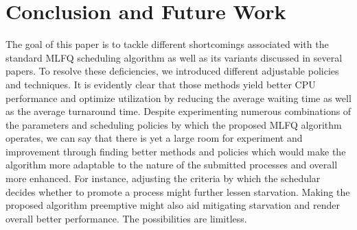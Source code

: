 \documentclass[conference]{IEEEtran}
\begin{document}

\section{Conclusion and Future Work}

The goal of this paper is to tackle different shortcomings associated with the standard MLFQ scheduling algorithm as well as its variants discussed in several papers. To resolve these deficiencies, we introduced different adjustable policies and techniques. It is evidently clear that those methods yield better CPU performance and optimize utilization by reducing the average waiting time as well as the average turnaround time. Despite experimenting numerous combinations of the parameters and scheduling policies by which the proposed MLFQ algorithm operates, we can say that there is yet a large room for experiment and improvement through finding better methods and policies which would make the algorithm more adaptable to the nature of the submitted processes and overall more enhanced. For instance, adjusting the criteria by which the schedular decides whether to promote a process might further lessen starvation. Making the proposed algorithm preemptive might also aid mitigating starvation and render overall better performance. The possibilities are limitless.

\end{document}
